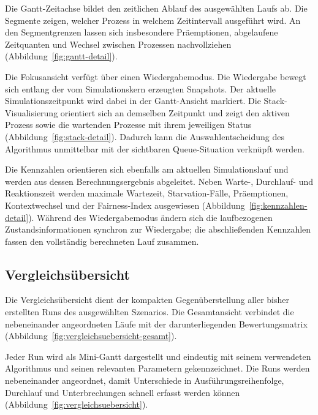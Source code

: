 

Die Gantt-Zeitachse bildet den zeitlichen Ablauf des ausgewählten Laufs ab. Die Segmente zeigen, welcher Prozess in welchem Zeitintervall ausgeführt wird. An den Segmentgrenzen lassen sich insbesondere Präemptionen, abgelaufene Zeitquanten und Wechsel zwischen Prozessen nachvollziehen (Abbildung~\ref{fig:gantt-detail}).



Die Fokusansicht verfügt über einen Wiedergabemodus. Die Wiedergabe bewegt sich entlang der vom Simulationskern erzeugten Snapshots. Der aktuelle Simulationszeitpunkt wird dabei in der Gantt-Ansicht markiert. Die Stack-Visualisierung orientiert sich an demselben Zeitpunkt und zeigt den aktiven Prozess sowie die wartenden Prozesse mit ihrem jeweiligen Status (Abbildung~\ref{fig:stack-detail}). Dadurch kann die Auswahlentscheidung des Algorithmus unmittelbar mit der sichtbaren Queue-Situation verknüpft werden.



Die Kennzahlen orientieren sich ebenfalls am aktuellen Simulationslauf und werden aus dessen Berechnungsergebnis abgeleitet. Neben Warte-, Durchlauf- und Reaktionszeit werden maximale Wartezeit, Starvation-Fälle, Präemptionen, Kontextwechsel und der Fairness-Index ausgewiesen (Abbildung~\ref{fig:kennzahlen-detail}). Während des Wiedergabemodus ändern sich die laufbezogenen Zustandsinformationen synchron zur Wiedergabe; die abschließenden Kennzahlen fassen den vollständig berechneten Lauf zusammen.



\FloatBarrier

\subsection{Vergleichsübersicht}

Die Vergleichsübersicht dient der kompakten Gegenüberstellung aller bisher erstellten Runs des ausgewählten Szenarios. Die Gesamtansicht verbindet die nebeneinander angeordneten Läufe mit der darunterliegenden Bewertungsmatrix (Abbildung~\ref{fig:vergleichsuebersicht-gesamt}).



Jeder Run wird als Mini-Gantt dargestellt und eindeutig mit seinem verwendeten Algorithmus und seinen relevanten Parametern gekennzeichnet. Die Runs werden nebeneinander angeordnet, damit Unterschiede in Ausführungsreihenfolge, Durchlauf und Unterbrechungen schnell erfasst werden können (Abbildung~\ref{fig:vergleichsuebersicht}).

